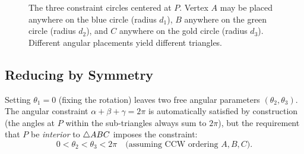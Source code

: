 \begin{figure}[h!]
\centering
{}
\caption{The three constraint circles centered at $P$. Vertex $A$ may be placed anywhere on the blue circle (radius $d_1$), $B$ anywhere on the green circle (radius $d_2$), and $C$ anywhere on the gold circle (radius $d_3$). Different angular placements yield different triangles.}
\label{fig:constraint-circles}
\end{figure}

\subsection{Reducing by Symmetry}

Setting $\theta_1 = 0$ (fixing the rotation) leaves two free angular parameters $(\theta_2, \theta_3)$. The angular constraint $\alpha + \beta + \gamma = 2\pi$ is automatically satisfied by construction (the angles at $P$ within the sub-triangles always sum to $2\pi$), but the requirement that $P$ be \emph{interior} to $\triangle ABC$ imposes the constraint:
\begin{equation}
\label{eq:interior-constraint}
0 < \theta_2 < \theta_3 < 2\pi \quad \text{(assuming CCW ordering $A, B, C$).}
\end{equation}


